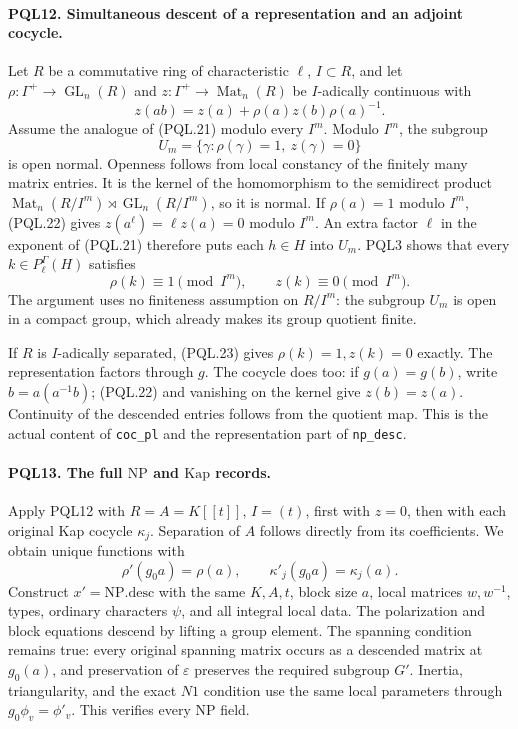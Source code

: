 \paragraph{PQL12. Simultaneous descent of a representation and an adjoint cocycle.}
\label{claim:PQL12}
Let \(R\) be a commutative ring of characteristic \(\ell\),
\(I\subset R\), and let \(\rho:\Gamma^+\to
\operatorname{GL}_n(R)\) and \(z:\Gamma^+\to\operatorname{Mat}_n(R)\)
be \(I\)-adically continuous with
\[
 z(ab)=z(a)+\rho(a)z(b)\rho(a)^{-1}.                 \tag{PQL.22}
\]
Assume the analogue of (PQL.21) modulo every \(I^m\).
Modulo \(I^m\), the subgroup
\[
 U_m=\{\gamma:\rho(\gamma)=1,\ z(\gamma)=0\}
\]
is open normal. Openness follows from local constancy
of the finitely many matrix entries. It is the kernel
of the homomorphism to the semidirect product
\(\operatorname{Mat}_n(R/I^m)\rtimes
\operatorname{GL}_n(R/I^m)\), so it is normal.
If \(\rho(a)=1\) modulo \(I^m\), (PQL.22) gives
\(z(a^\ell)=\ell z(a)=0\) modulo \(I^m\).
An extra factor \(\ell\) in the exponent of (PQL.21)
therefore puts each \(h\in H\) into \(U_m\).
PQL3 shows that every \(k\in P_\ell^\Gamma(H)\) satisfies
\[
 \rho(k)\equiv1\pmod{I^m},\qquad z(k)\equiv0\pmod{I^m}.
                                                            \tag{PQL.23}
\]
The argument uses no finiteness assumption on \(R/I^m\):
the subgroup \(U_m\) is open in a compact group, which
already makes its group quotient finite.

If \(R\) is \(I\)-adically separated, (PQL.23) gives
\(\rho(k)=1,z(k)=0\) exactly.
The representation factors through \(g\). The cocycle
does too: if \(g(a)=g(b)\), write \(b=a(a^{-1}b)\);
(PQL.22) and vanishing on the kernel give \(z(b)=z(a)\).
Continuity of the descended entries follows from the
quotient map. This is the actual content of
\texttt{coc\_pl} and the representation part of
\texttt{np\_desc}.

\paragraph{PQL13. The full \(\mathrm{NP}\) and \(\mathrm{Kap}\) records.}
\label{claim:PQL13}
Apply PQL12 with \(R=A=K[[t]]\), \(I=(t)\), first
with \(z=0\), then with each original Kap cocycle
\(\kappa_j\). Separation of \(A\) follows directly
from its coefficients. We obtain unique functions with
\[
 \rho'(g_0a)=\rho(a),\qquad
 \kappa'_j(g_0a)=\kappa_j(a).                       \tag{PQL.24}
\]
Construct \(x'=\mathrm{NP.desc}\) with the same \(K,A,t\),
block size \(a\), local matrices \(w,w^{-1}\), types,
ordinary characters \(\psi\), and all integral local data.
The polarization and block equations descend by lifting
a group element. The spanning condition remains true:
every original spanning matrix occurs as a descended
matrix at \(g_0(a)\), and preservation of \(\varepsilon\)
preserves the required subgroup \(G'\).
Inertia, triangularity, and the exact \(N1\) condition
use the same local parameters through \(g_0\phi_v=\phi'_v\).
This verifies every \(\mathrm{NP}\) field.

